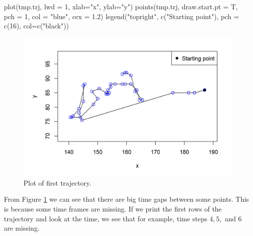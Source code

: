 \documentclass[
  11pt,
]{krantz}
\newenvironment{Shaded}{\begin{snugshade}}{\end{snugshade}}
\newcommand{\AttributeTok}[1]{\textcolor[rgb]{0.61,0.61,0.61}{#1}}
\newcommand{\DecValTok}[1]{\textcolor[rgb]{0.06,0.06,0.06}{#1}}
\newcommand{\FloatTok}[1]{\textcolor[rgb]{0.06,0.06,0.06}{#1}}
\newcommand{\FunctionTok}[1]{\textcolor[rgb]{0,0,0}{#1}}
\newcommand{\NormalTok}[1]{#1}
\newcommand{\StringTok}[1]{\textcolor[rgb]{0.5,0.5,0.5}{#1}}
\begin{document}
\begin{Shaded}
\begin{Highlighting}[]
\FunctionTok{plot}\NormalTok{(tmp.trj, }\AttributeTok{lwd =} \DecValTok{1}\NormalTok{, }\AttributeTok{xlab=}\StringTok{"x"}\NormalTok{, }\AttributeTok{ylab=}\StringTok{"y"}\NormalTok{)}
\FunctionTok{points}\NormalTok{(tmp.trj, }\AttributeTok{draw.start.pt =}\NormalTok{ T, }\AttributeTok{pch =} \DecValTok{1}\NormalTok{, }\AttributeTok{col =} \StringTok{"blue"}\NormalTok{, }\AttributeTok{cex =} \FloatTok{1.2}\NormalTok{)}
\FunctionTok{legend}\NormalTok{(}\StringTok{"topright"}\NormalTok{, }\FunctionTok{c}\NormalTok{(}\StringTok{"Starting point"}\NormalTok{), }\AttributeTok{pch =} \FunctionTok{c}\NormalTok{(}\DecValTok{16}\NormalTok{), }\AttributeTok{col=}\FunctionTok{c}\NormalTok{(}\StringTok{"black"}\NormalTok{))}
\end{Highlighting}
\end{Shaded}

\begin{figure}

{\centering \includegraphics[width=1\linewidth]{images/traj_plot} 

}

\caption{Plot of first trajectory.}\label{fig:trajPlot}
\end{figure}

From Figure \ref{fig:trajPlot} we can see that there are big time gaps between some points. This is because some time frames are missing. If we print the first rows of the trajectory and look at the time, we see that for example, time steps \(4,5,\) and \(6\) are missing.
\end{document}
